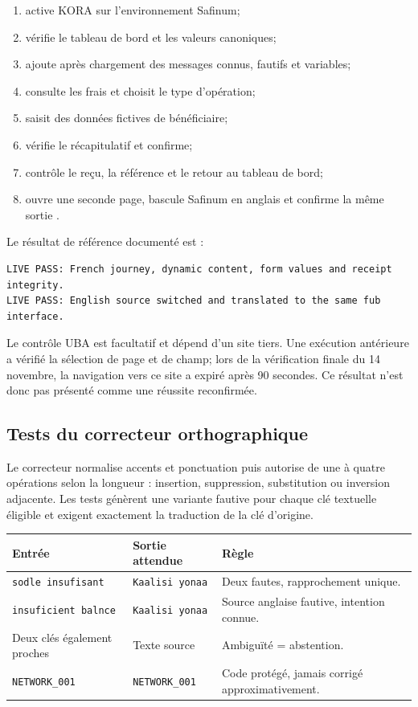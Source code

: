 \begin{enumerate}
  \item active KORA sur l’environnement Safinum;
  \item vérifie le tableau de bord et les valeurs canoniques;
  \item ajoute après chargement des messages connus, fautifs et variables;
  \item consulte les frais et choisit le type d’opération;
  \item saisit des données fictives de bénéficiaire;
  \item vérifie le récapitulatif et confirme;
  \item contrôle le reçu, la référence et le retour au tableau de bord;
  \item ouvre une seconde page, bascule Safinum en anglais et confirme la
        même sortie .
\end{enumerate}

Le résultat de référence documenté est :

\begin{lstlisting}[language={}]
LIVE PASS: French journey, dynamic content, form values and receipt integrity.
LIVE PASS: English source switched and translated to the same fub interface.
\end{lstlisting}

Le contrôle UBA est facultatif et dépend d’un site tiers. Une exécution
antérieure a vérifié la sélection de page et de champ; lors de la vérification
finale du 14 novembre, la navigation vers ce site a expiré après 90 secondes.
Ce résultat n’est donc pas présenté comme une réussite reconfirmée.

\subsection{Tests du correcteur orthographique}

Le correcteur normalise accents et ponctuation puis autorise de une à quatre
opérations selon la longueur : insertion, suppression, substitution ou
inversion adjacente. Les tests génèrent une variante fautive pour chaque clé
textuelle éligible et exigent exactement la traduction de la clé d’origine.

\begin{tabularx}{\linewidth}{@{}|L{39mm}|L{50mm}|Y|@{}}
\hline
\textbf{Entrée} & \textbf{Sortie attendue} & \textbf{Règle}\\
\hline
\texttt{sodle insufisant} &
\texttt{Kaalisi yonaa} &
Deux fautes, rapprochement unique.\\
\hline
\texttt{insuficient balnce} &
\texttt{Kaalisi yonaa} &
Source anglaise fautive, intention connue.\\
\hline
Deux clés également proches &
Texte source &
Ambiguïté = abstention.\\
\hline
\texttt{NETWORK\_001} &
\texttt{NETWORK\_001} &
Code protégé, jamais corrigé approximativement.\\
\hline
\end{tabularx}

